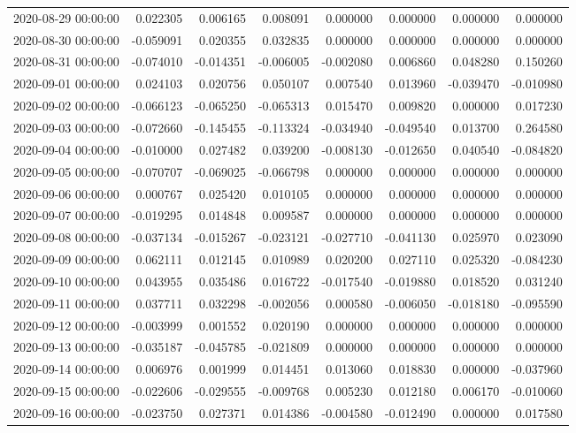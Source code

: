 \begin{tabular}{lrrrrrrr}
2020-08-29 00:00:00 & 0.022305 & 0.006165 & 0.008091 & 0.000000 & 0.000000 & 0.000000 & 0.000000 \\
2020-08-30 00:00:00 & -0.059091 & 0.020355 & 0.032835 & 0.000000 & 0.000000 & 0.000000 & 0.000000 \\
2020-08-31 00:00:00 & -0.074010 & -0.014351 & -0.006005 & -0.002080 & 0.006860 & 0.048280 & 0.150260 \\
2020-09-01 00:00:00 & 0.024103 & 0.020756 & 0.050107 & 0.007540 & 0.013960 & -0.039470 & -0.010980 \\
2020-09-02 00:00:00 & -0.066123 & -0.065250 & -0.065313 & 0.015470 & 0.009820 & 0.000000 & 0.017230 \\
2020-09-03 00:00:00 & -0.072660 & -0.145455 & -0.113324 & -0.034940 & -0.049540 & 0.013700 & 0.264580 \\
2020-09-04 00:00:00 & -0.010000 & 0.027482 & 0.039200 & -0.008130 & -0.012650 & 0.040540 & -0.084820 \\
2020-09-05 00:00:00 & -0.070707 & -0.069025 & -0.066798 & 0.000000 & 0.000000 & 0.000000 & 0.000000 \\
2020-09-06 00:00:00 & 0.000767 & 0.025420 & 0.010105 & 0.000000 & 0.000000 & 0.000000 & 0.000000 \\
2020-09-07 00:00:00 & -0.019295 & 0.014848 & 0.009587 & 0.000000 & 0.000000 & 0.000000 & 0.000000 \\
2020-09-08 00:00:00 & -0.037134 & -0.015267 & -0.023121 & -0.027710 & -0.041130 & 0.025970 & 0.023090 \\
2020-09-09 00:00:00 & 0.062111 & 0.012145 & 0.010989 & 0.020200 & 0.027110 & 0.025320 & -0.084230 \\
2020-09-10 00:00:00 & 0.043955 & 0.035486 & 0.016722 & -0.017540 & -0.019880 & 0.018520 & 0.031240 \\
2020-09-11 00:00:00 & 0.037711 & 0.032298 & -0.002056 & 0.000580 & -0.006050 & -0.018180 & -0.095590 \\
2020-09-12 00:00:00 & -0.003999 & 0.001552 & 0.020190 & 0.000000 & 0.000000 & 0.000000 & 0.000000 \\
2020-09-13 00:00:00 & -0.035187 & -0.045785 & -0.021809 & 0.000000 & 0.000000 & 0.000000 & 0.000000 \\
2020-09-14 00:00:00 & 0.006976 & 0.001999 & 0.014451 & 0.013060 & 0.018830 & 0.000000 & -0.037960 \\
2020-09-15 00:00:00 & -0.022606 & -0.029555 & -0.009768 & 0.005230 & 0.012180 & 0.006170 & -0.010060 \\
2020-09-16 00:00:00 & -0.023750 & 0.027371 & 0.014386 & -0.004580 & -0.012490 & 0.000000 & 0.017580 \\

\end{tabular}
